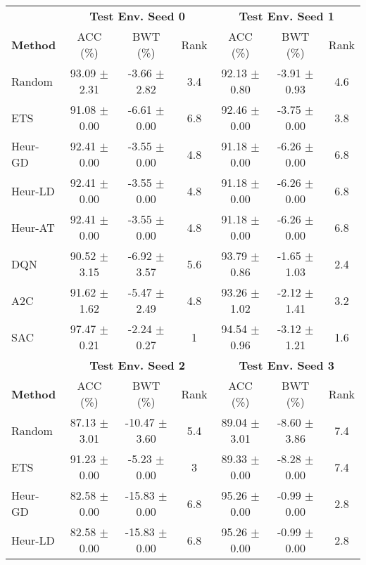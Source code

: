 \begin{tabular}{lcccccc}
	\toprule 
	& \multicolumn{3}{c}{\textbf{Test Env. Seed 0}} & \multicolumn{3}{c}{\textbf{Test Env. Seed 1}} \\
	\cmidrule(lr){2-4} \cmidrule(lr){5-7}
	\textbf{Method} & ACC (\%)         & BWT (\%)          & Rank   & ACC (\%)         & BWT (\%)          & Rank   \\
	\midrule 
	Random          & 93.09 $\pm$ 2.31   & -3.66 $\pm$ 2.82    & 3.4    & 92.13 $\pm$ 0.80   & -3.91 $\pm$ 0.93    & 4.6    \\
	ETS             & 91.08 $\pm$ 0.00   & -6.61 $\pm$ 0.00    & 6.8    & 92.46 $\pm$ 0.00   & -3.75 $\pm$ 0.00    & 3.8    \\
	Heur-GD         & 92.41 $\pm$ 0.00   & -3.55 $\pm$ 0.00    & 4.8    & 91.18 $\pm$ 0.00   & -6.26 $\pm$ 0.00    & 6.8    \\
	Heur-LD         & 92.41 $\pm$ 0.00   & -3.55 $\pm$ 0.00    & 4.8    & 91.18 $\pm$ 0.00   & -6.26 $\pm$ 0.00    & 6.8    \\
	Heur-AT         & 92.41 $\pm$ 0.00   & -3.55 $\pm$ 0.00    & 4.8    & 91.18 $\pm$ 0.00   & -6.26 $\pm$ 0.00    & 6.8    \\
	DQN             & 90.52 $\pm$ 3.15   & -6.92 $\pm$ 3.57    & 5.6    & 93.79 $\pm$ 0.86   & -1.65 $\pm$ 1.03    & 2.4    \\
	A2C             & 91.62 $\pm$ 1.62   & -5.47 $\pm$ 2.49    & 4.8    & 93.26 $\pm$ 1.02   & -2.12 $\pm$ 1.41    & 3.2    \\
	SAC             & 97.47 $\pm$ 0.21   & -2.24 $\pm$ 0.27    & 1      & 94.54 $\pm$ 0.96   & -3.12 $\pm$ 1.21    & 1.6    \\
	\midrule 
	& \multicolumn{3}{c}{\textbf{Test Env. Seed 2}} & \multicolumn{3}{c}{\textbf{Test Env. Seed 3}} \\
	\cmidrule(lr){2-4} \cmidrule(lr){5-7}
	\textbf{Method} & ACC (\%)         & BWT (\%)          & Rank   & ACC (\%)         & BWT (\%)          & Rank   \\
	\midrule 
	Random          & 87.13 $\pm$ 3.01   & -10.47 $\pm$ 3.60   & 5.4    & 89.04 $\pm$ 3.01   & -8.60 $\pm$ 3.86    & 7.4    \\
	ETS             & 91.23 $\pm$ 0.00   & -5.23 $\pm$ 0.00    & 3      & 89.33 $\pm$ 0.00   & -8.28 $\pm$ 0.00    & 7.4    \\
	Heur-GD         & 82.58 $\pm$ 0.00   & -15.83 $\pm$ 0.00   & 6.8    & 95.26 $\pm$ 0.00   & -0.99 $\pm$ 0.00    & 2.8    \\
	Heur-LD         & 82.58 $\pm$ 0.00   & -15.83 $\pm$ 0.00   & 6.8    & 95.26 $\pm$ 0.00   & -0.99 $\pm$ 0.00    & 2.8    \\

\end{tabular}
